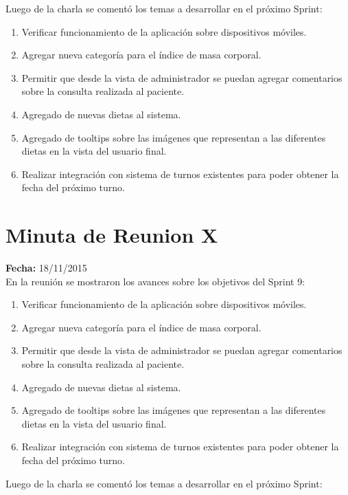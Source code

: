 \documentclass[runningheads,a4paper,spanish]{llncs}
\begin{document}
\begin{flushleft}
Luego de la charla se comentó los temas a desarrollar en el próximo Sprint:
\end{flushleft}

\begin{enumerate}
	\item Verificar funcionamiento de la aplicación sobre dispositivos móviles.
	\item Agregar nueva categoría para el índice de masa corporal.
	\item Permitir que desde la vista de administrador se puedan agregar comentarios sobre la consulta realizada al paciente.
	\item Agregado de nuevas dietas al sistema.
	\item Agregado de tooltips sobre las imágenes que representan a las diferentes dietas en la vista del usuario final.	
	\item Realizar integración con sistema de turnos existentes para poder obtener la fecha del próximo turno.
\end{enumerate}

\section{Minuta de Reunion X}

\textbf{Fecha: }18/11/2015\\

En la reunión se mostraron los avances sobre los objetivos del Sprint 9:
\begin{enumerate}
\item Verificar funcionamiento de la aplicación sobre dispositivos móviles.
\item Agregar nueva categoría para el índice de masa corporal.
\item Permitir que desde la vista de administrador se puedan agregar comentarios sobre la consulta realizada al paciente.
\item Agregado de nuevas dietas al sistema.
\item Agregado de tooltips sobre las imágenes que representan a las diferentes dietas en la vista del usuario final.
\item Realizar integración con sistema de turnos existentes para poder obtener la fecha del próximo turno.
\end{enumerate}

\begin{flushleft}
Luego de la charla se comentó los temas a desarrollar en el próximo Sprint:
\end{flushleft}
\end{document}
